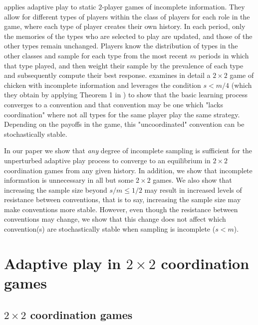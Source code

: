 \documentclass[11.5pt]{article}
\begin{document}
\cite{jensen2005evolution} applies adaptive play to static $2$-player games of incomplete information. They allow for different types of players within the class of players for each role in the game, where  each type of player creates their own history. In each period, only the memories of the types who are selected to play are updated, and those of the other types remain unchanged. Players know the distribution of types in the other classes and sample for each type from the most recent $m$ periods in which that type played, and then weight their sample by the prevalence of each type and subsequently compute their best response. 
\cite{jensen2005evolution} examines in detail a $2\times 2$ game of chicken with incomplete information and leverages the condition $s<m/4$ (which they obtain by applying Theorem 1 in  \cite{young1993evolution})
to show that the basic learning process converges to a convention and that convention may be one which "lacks coordination" where not all types for the same player play the same strategy. Depending on the payoffs in the game, this "uncoordinated" convention can be stochastically stable. 

In our paper we show that \textit{any} degree of incomplete sampling is sufficient for the unperturbed adaptive play process to converge to an equilibrium in $2\times 2$ coordination games from any given history. In addition, we show that incomplete information is unnecessary in all but some $2 \times 2$ games. We also show that increasing the sample size beyond $s/m \leq 1/2$ may result in increased levels of resistance between conventions, that is to say, increasing the sample size may make conventions more stable. However, even though the resistance between conventions may change, we show that this change does not affect which convention(s) are stochastically stable when sampling is incomplete ($s<m$).

\section{Adaptive play in $2\times 2$ coordination games}

\subsection{$2\times 2$ coordination games}
\end{document}
